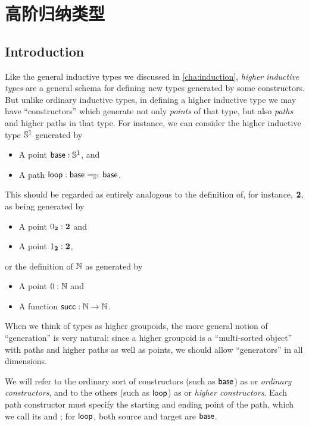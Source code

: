 \chapter{高阶归纳类型}
\label{cha:hits}

%
%
%

\section{Introduction}
\label{sec:intro-hits}


Like the general inductive types we discussed in \cref{cha:induction}, \emph{higher inductive types} are a general schema for defining new types generated by some constructors.
But unlike ordinary inductive types, in defining a higher inductive type we may have ``constructors'' which generate not only \emph{points} of that type, but also \emph{paths} and higher paths in that type.
%
%
For instance, we can consider the higher inductive type $\Sn^1$ generated by
\begin{itemize}
\item A point $\base:\Sn^1$, and
\item A path $\lloop : {\id[\Sn^1]\base\base}$.
\end{itemize}
This should be regarded as entirely analogous to the definition of, for instance, $\bool$, as being generated by
\begin{itemize}
\item A point $\bfalse:\bool$ and
\item A point $\btrue:\bool$,
\end{itemize}
or the definition of $\nat$ as generated by
\begin{itemize}
\item A point $0:\nat$ and
\item A function $\suc:\nat\to\nat$.
\end{itemize}
When we think of types as higher groupoids, the more general notion of ``generation'' is very natural:
since a higher groupoid is a ``multi-sorted object'' with paths and higher paths as well as points, we should allow ``generators'' in all dimensions.

We will refer to the ordinary sort of constructors (such as $\base$) as 
%
%
or \emph{ordinary constructors}, and to the others (such as $\lloop$) as 
%
%
or \emph{higher constructors}.
Each path constructor must specify the starting and ending point of the path, which we call its 
%
and ;
%
for $\lloop$, both source and target are $\base$.

